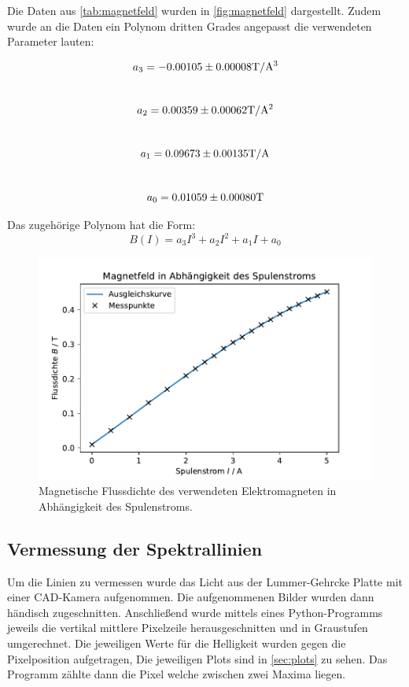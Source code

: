 \FloatBarrier
    Die Daten aus \autoref{tab:magnetfeld} wurden in \autoref{fig:magnetfeld} dargestellt. Zudem wurde 
    an die Daten ein Polynom dritten Grades angepasst die verwendeten Parameter lauten:
    \begin{center}
        $$a_3 = -0.00105 \pm 0.00008\si[]{T/A^3}$$\\
        $$a_2 =  0.00359 \pm 0.00062\si[]{T/A^2}$$\\
        $$a_1 =  0.09673 \pm 0.00135\si[]{T/A}$$\\
        $$a_0 =  0.01059 \pm 0.00080\si[]{T}$$
    \end{center}
    Das zugehörige Polynom hat die Form:
    \begin{equation*}
      B(I)=a_3I^3+a_2I^2+a_1I+a_0
    \end{equation*}

    \begin{figure}
        \centering
        \includegraphics[width=1\textwidth]{content/grafiken/magnetfeld.pdf}
        \caption{Magnetische Flussdichte des verwendeten Elektromagneten in Abhängigkeit des Spulenstroms.}
        \label{fig:magnetfeld}
      \end{figure}
\subsection{Vermessung der Spektrallinien}
\label{sec:linien}
Um die Linien zu vermessen wurde das Licht aus der Lummer-Gehrcke Platte mit einer CAD-Kamera
aufgenommen. Die aufgenommenen Bilder wurden dann händisch zugeschnitten. 
Anschließend wurde mittels eines Python-Programms jeweils die  vertikal mittlere
Pixelzeile herausgeschnitten und in Graustufen umgerechnet. Die jeweiligen Werte für die Helligkeit wurden 
gegen die Pixelposition aufgetragen, Die jeweiligen Plots sind in \autoref{sec:plots} zu sehen.  Das Programm 
zählte dann die  Pixel welche zwischen zwei Maxima liegen. 
\FloatBarrier
